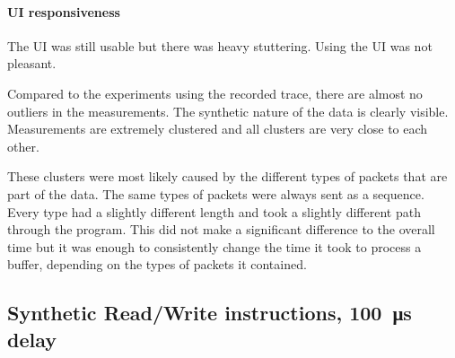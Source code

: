 \paragraph{UI responsiveness}

The UI was still usable but there was heavy stuttering. Using the UI was not pleasant.
\bigbreak

Compared to the experiments using the recorded trace, there are almost no outliers in the measurements.
The synthetic nature of the data is clearly visible. Measurements are extremely clustered and all
clusters are very close to each other.

These clusters were most likely caused by the different types of packets that are part of the data.
The same types of packets were always sent as a sequence. Every type had a slightly different length
and took a slightly different path through the program. This did not make a significant difference to
the overall time but it was enough to consistently change the time it took to process a buffer,
depending on the types of packets it contained.

\clearpage
\subsection{Synthetic Read/Write instructions, \SI{100}{\micro\second} delay}
\label{evaluation/results/synthetic-read-write-instructions-100us-delay}

